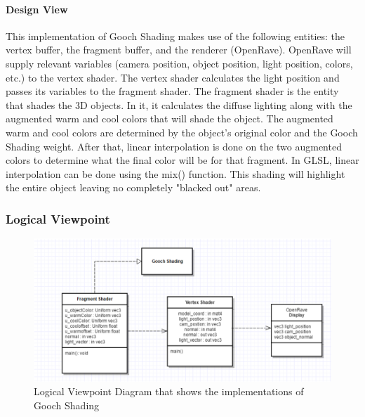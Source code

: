 \begin{flushleft}
\paragraph{Design View}
This implementation of Gooch Shading makes use of the following entities: the vertex buffer, the fragment buffer, and the renderer (OpenRave). 
OpenRave will supply relevant variables (camera position, object position, light position, colors, etc.) to the vertex shader.
The vertex shader calculates the light position and passes its variables to the fragment shader.
The fragment shader is the entity that shades the 3D objects.
In it, it calculates the diffuse lighting along with the augmented warm and cool colors that will shade the object.
The augmented warm and cool colors are determined by the object's original color and the Gooch Shading weight.
After that, linear interpolation is done on the two augmented colors to determine what the final color will be for that fragment.
In GLSL, linear interpolation can be done using the mix() function.
This shading will highlight the entire object leaving no completely "blacked out" areas.

\newpage

\subsubsection{Logical Viewpoint}

\begin{figure} [H]
  \includegraphics[scale=0.8]{designdoc_v1/Gooch_Shading_composition.eps}
  \caption
{ \newline \hspace{\linewidth}
Logical Viewpoint Diagram that shows the implementations of Gooch Shading}
  \label{fig:Gooch_Shading_composition}
\end{figure}


\end{flushleft}
